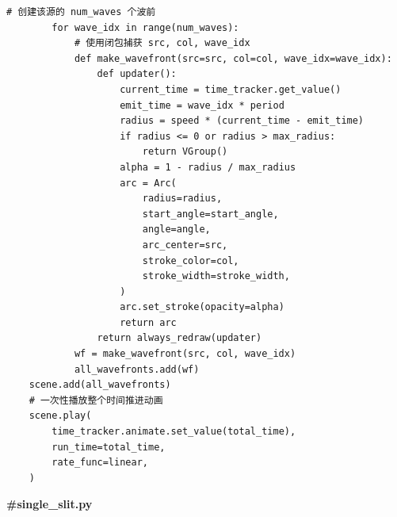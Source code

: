 \documentclass[12pt,a4paper]{ctexrep}
\begin{document}
\begin{lstlisting}[style=pycode]
        # 创建该源的 num_waves 个波前
        for wave_idx in range(num_waves):
            # 使用闭包捕获 src, col, wave_idx
            def make_wavefront(src=src, col=col, wave_idx=wave_idx):
                def updater():
                    current_time = time_tracker.get_value()
                    emit_time = wave_idx * period
                    radius = speed * (current_time - emit_time)
                    if radius <= 0 or radius > max_radius:
                        return VGroup()
                    alpha = 1 - radius / max_radius
                    arc = Arc(
                        radius=radius,
                        start_angle=start_angle,
                        angle=angle,
                        arc_center=src,
                        stroke_color=col,
                        stroke_width=stroke_width,
                    )
                    arc.set_stroke(opacity=alpha)
                    return arc
                return always_redraw(updater)
            wf = make_wavefront(src, col, wave_idx)
            all_wavefronts.add(wf)
    scene.add(all_wavefronts)
    # 一次性播放整个时间推进动画
    scene.play(
        time_tracker.animate.set_value(total_time),
        run_time=total_time,
        rate_func=linear,
    )
\end{lstlisting}

\textbf{\#single\_slit.py}
\end{document}
